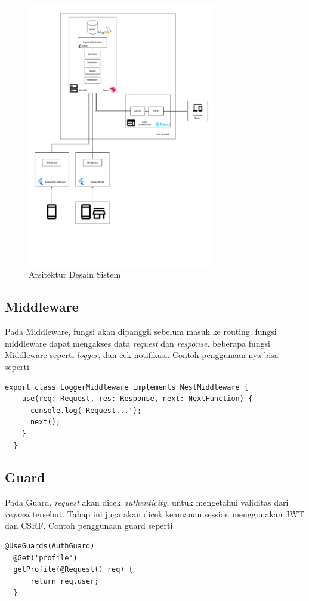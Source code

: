 \begin{figure}[h]
	\centering
	\includegraphics[width=0.73\textwidth]{drawio/System-Design-Architecture.drawio.pdf}
	\caption{Arsitektur Desain Sistem}
	\label{sistem-desain-arsitektur}
\end{figure}

\newpage
\subsection{Middleware}
Pada Middleware, fungsi akan dipanggil sebelum masuk ke routing. fungsi middleware dapat mengakses data \textit{request} dan \textit{response}. beberapa fungsi Middleware seperti \textit{logger}, dan cek notifikasi. Contoh penggunaan nya bisa seperti
\begin{lstlisting}[caption={Middleware},label={lst:middleware}]
  export class LoggerMiddleware implements NestMiddleware {
    use(req: Request, res: Response, next: NextFunction) {
      console.log('Request...');
      next();
    }
  }  
\end{lstlisting}

\subsection{Guard}
Pada Guard, \textit{request} akan dicek \textit{authenticity}, untuk mengetahui validitas dari \textit{request} tersebut. Tahap ini juga akan dicek keamanan session menggunakan JWT dan CSRF. Contoh penggunaan guard seperti
\begin{lstlisting}[caption={Penggunaan Guards pada Controller},label={lst:guard}]
  @UseGuards(AuthGuard)
  @Get('profile')
  getProfile(@Request() req) {
      return req.user;
  }
\end{lstlisting}


